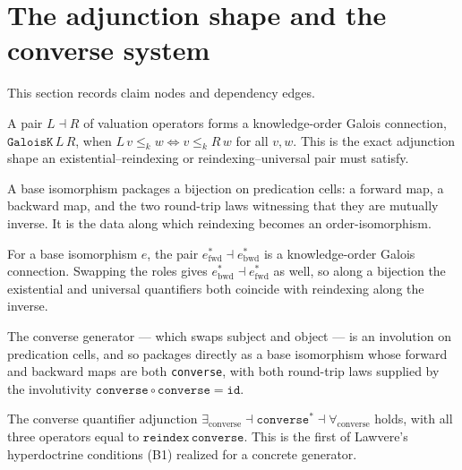 \section{The adjunction shape and the converse system}

This section records claim nodes and dependency edges.

\begin{proposition}\label{thm:galoisK}\leanok{}
A pair $L \dashv R$ of valuation operators forms a knowledge-order Galois
connection, $\texttt{GaloisK}\,L\,R$, when $L\,v \le_k w \iff v \le_k R\,w$ for
all $v, w$. This is the exact adjunction shape an existential--reindexing or
reindexing--universal pair must satisfy.
\end{proposition}
\begin{proposition}\label{thm:baseIso}\leanok{}
A base isomorphism packages a bijection on predication cells: a forward map, a
backward map, and the two round-trip laws witnessing that they are mutually
inverse. It is the data along which reindexing becomes an order-isomorphism.
\end{proposition}
\begin{theorem}\label{thm:galois-reindex}\leanok{}
For a base isomorphism $e$, the pair $e_{\mathrm{fwd}}^{*} \dashv
e_{\mathrm{bwd}}^{*}$ is a knowledge-order Galois connection. Swapping the roles
gives $e_{\mathrm{bwd}}^{*} \dashv e_{\mathrm{fwd}}^{*}$ as well, so along a
bijection the existential and universal quantifiers both coincide with reindexing
along the inverse.
\end{theorem}
\begin{proposition}\label{thm:converseIso}\leanok{}
The converse generator --- which swaps subject and object --- is an involution on
predication cells, and so packages directly as a base isomorphism whose forward
and backward maps are both \texttt{converse}, with both round-trip laws supplied
by the involutivity $\texttt{converse}\circ\texttt{converse} = \texttt{id}$.
\end{proposition}
\begin{theorem}\label{thm:converse-adjunction}\leanok{}
The converse quantifier adjunction $\exists_{\mathrm{converse}} \dashv
\texttt{converse}^{*} \dashv \forall_{\mathrm{converse}}$ holds, with all three
operators equal to $\texttt{reindex}\,\texttt{converse}$. This is the first of
Lawvere's hyperdoctrine conditions (B1) realized for a concrete generator.
\end{theorem}
